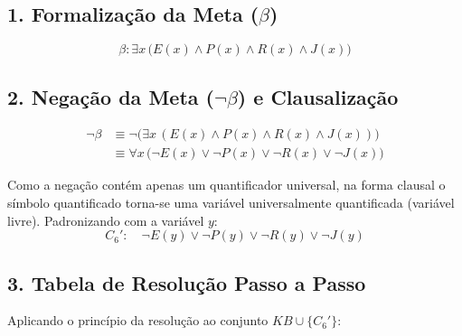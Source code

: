 \documentclass[11pt,a4paper]{article}
\begin{document}
\subsection*{1. Formalização da Meta ($\beta$)}
\[
\beta: \exists x \, \Big( E(x) \land P(x) \land R(x) \land J(x) \Big)
\]

\subsection*{2. Negação da Meta ($\neg \beta$) e Clausalização}
\begin{align*}
\neg \beta & \equiv \neg \Big( \exists x \, (E(x) \land P(x) \land R(x) \land J(x)) \Big) \\
& \equiv \forall x \, \Big( \neg E(x) \lor \neg P(x) \lor \neg R(x) \lor \neg J(x) \Big)
\end{align*}

Como a negação contém apenas um quantificador universal, na forma clausal o símbolo quantificado torna-se uma variável universalmente quantificada (variável livre). Padronizando com a variável $y$:
\[
C_6': \quad \neg E(y) \lor \neg P(y) \lor \neg R(y) \lor \neg J(y)
\]

\subsection*{3. Tabela de Resolução Passo a Passo}

Aplicando o princípio da resolução ao conjunto $KB \cup \{C_6'\}$:

\begin{center}
\small
{}
\end{center}
\end{document}
